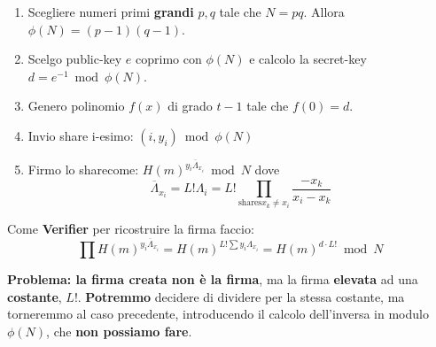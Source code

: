 \begin{enumerate}
    \item Scegliere numeri primi \textbf{grandi} $p,q$ tale che $N=pq$. Allora $\phi(N)=(p-1)(q-1)$.
    \item Scelgo public-key $e$ coprimo con $\phi(N)$ e calcolo la secret-key $d=e^{-1}\bmod\phi(N)$.
    \item Genero polinomio $f(x)$ di grado $t-1$ tale che $f(0)=d$.
    \item Invio share i-esimo: $(i,y_i)\bmod\phi(N)$
    \item Firmo lo share\footnotemark come: $H(m)^{y_i\overline{\Lambda}_{x_i}}\bmod N$ dove
    \[\overline{\Lambda}_{x_i}=L!\Lambda_i=L!\prod_{\text{shares} x_k\ne x_i}\frac{-x_k}{x_i-x_k}\]
\end{enumerate}
Come \textbf{Verifier} per ricostruire la firma faccio:
\[\prod H(m)^{y_i\overline{\Lambda}_{x_i}}=H(m)^{L!\sum y_i\Lambda_{x_i}}=H(m)^{d\cdot L!}\bmod{N}\]
\begin{note}
\textbf{Problema: la firma creata non è la firma}, ma la firma \textbf{elevata} ad una \textbf{costante}, $L!$. \textbf{Potremmo} decidere di dividere per la stessa costante, ma torneremmo al caso precedente, introducendo il calcolo dell'inversa in modulo $\phi(N)$, che \textbf{non possiamo fare}.\end{note}

